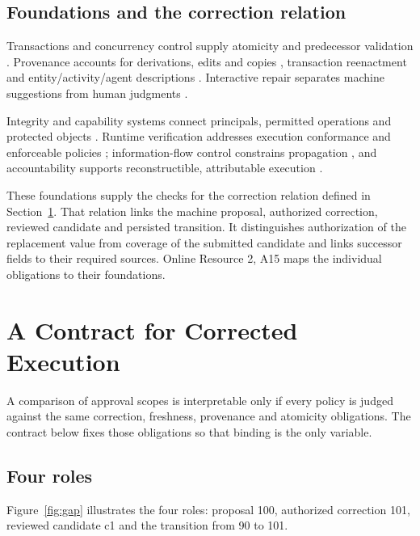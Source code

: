 \documentclass[pdflatex,sn-basic]{sn-jnl}
\begin{document}
\subsection{Foundations and the correction relation}\label{foundations-and-the-correction-relation}

Transactions and concurrency control supply atomicity and predecessor validation \citep{gray-transaction,kung-occ}. Provenance accounts for derivations, edits and copies \citep{buneman-provenance,cheney-provenance,buneman-curated}, transaction reenactment \citep{arab-reenactment} and entity/activity/agent descriptions \citep{prov-dm}. Interactive repair separates machine suggestions from human judgments \citep{yakout-guided-repair,falcon-cleaning}.

Integrity and capability systems connect principals, permitted operations and protected objects \citep{clark-wilson,hardy-confused-deputy,miller-robust-composition}. Runtime verification addresses execution conformance and enforceable policies \citep{runtime-verification,policy-enforcement}; information-flow control constrains propagation \citep{ifc}, and accountability supports reconstructible, attributable execution \citep{accountability}.

These foundations supply the checks for the correction relation defined in Section~\ref{a-contract-for-corrected-execution}. That relation links the machine proposal, authorized correction, reviewed candidate and persisted transition. It distinguishes authorization of the replacement value from coverage of the submitted candidate and links successor fields to their required sources. Online Resource 2, A15 maps the individual obligations to their foundations.

\section{A Contract for Corrected Execution}\label{a-contract-for-corrected-execution}

A comparison of approval scopes is interpretable only if every policy is judged against the same correction, freshness, provenance and atomicity obligations. The contract below fixes those obligations so that binding is the only variable.

\subsection{Four roles}\label{four-roles}

Figure~\ref{fig:gap} illustrates the four roles: proposal 100, authorized correction 101, reviewed candidate c1 and the transition from 90 to 101.
\end{document}
